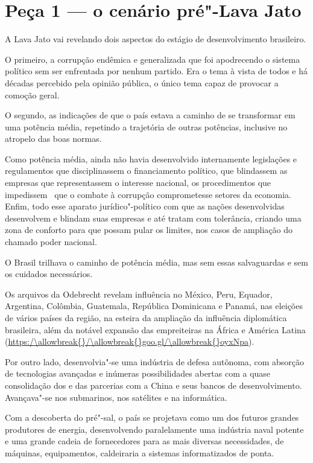  

\section{Peça 1 --- o cenário pré"-Lava Jato}

A Lava Jato vai revelando dois aspectos do estágio de desenvolvimento
brasileiro.

O primeiro, a corrupção endêmica e generalizada que foi apodrecendo o
sistema político sem ser enfrentada por nenhum partido. Era o tema à
vista de todos e há décadas percebido pela opinião pública, o único tema
capaz de provocar a comoção geral.

O segundo, as indicações de que o país estava a caminho de se
transformar em uma potência média, repetindo a trajetória de outras
potências, inclusive no atropelo das boas normas.

Como potência média, ainda não havia desenvolvido internamente
legislações e regulamentos que disciplinassem o financiamento político,
que blindassem as empresas que representassem o interesse nacional, os
procedimentos que impedissem ~que o combate à corrupção comprometesse
setores da economia. Enfim, todo esse aparato jurídico"-político com que
as nações desenvolvidas desenvolvem e blindam suas empresas e até tratam
com tolerância, criando uma zona de conforto para que possam pular os
limites, nos casos de ampliação do chamado poder nacional.

O Brasil trilhava o caminho de potência média, mas sem essas
salvaguardas e sem os cuidados necessários.

Os arquivos da Odebrecht revelam influência no México, Peru, Equador,
Argentina, Colômbia, Guatemala, República Dominicana e Panamá, nas
eleições de vários países da região, na esteira da ampliação da
influência diplomática brasileira, além da notável expansão das
empreiteiras na África e América Latina (\url{https:/\allowbreak{}/\allowbreak{}goo.gl/\allowbreak{}oyxNpa}).

Por outro lado, desenvolvia"-se uma indústria de defesa autônoma, com
absorção de tecnologias avançadas e inúmeras possibilidades abertas com
a quase consolidação dos  e das parcerias com a China e seus bancos
de desenvolvimento. Avançava"-se nos submarinos, nos satélites e na
informática.

Com a descoberta do pré"-sal, o país se projetava como um dos futuros
grandes produtores de energia, desenvolvendo paralelamente uma indústria
naval potente e uma grande cadeia de fornecedores para as mais diversas
necessidades, de máquinas, equipamentos, caldeiraria a sistemas
informatizados de ponta.

